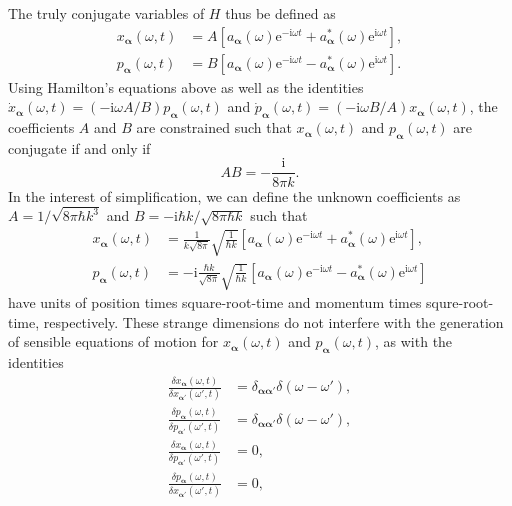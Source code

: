 \documentclass{article}
\numberwithin{equation}{section}
\begin{document}
The truly conjugate variables of $H$ thus be defined as
\begin{equation}
\begin{split}
x_{\bm{\alpha}}(\omega,t) &= A\left[a_{\bm{\alpha}}(\omega)\mathrm{e}^{-\mathrm{i}\omega t} + a_{\bm{\alpha}}^*(\omega)\mathrm{e}^{\mathrm{i}\omega t}\right],\\
p_{\bm{\alpha}}(\omega,t) &= B\left[a_{\bm{\alpha}}(\omega)\mathrm{e}^{-\mathrm{i}\omega t} - a_{\bm{\alpha}}^*(\omega)\mathrm{e}^{\mathrm{i}\omega t}\right].
\end{split}
\end{equation}
Using Hamilton's equations above as well as the identities $\dot{x}_{\bm{\alpha}}(\omega,t) = (-\mathrm{i}\omega A/B)p_{\bm{\alpha}}(\omega,t)$ and $\dot{p}_{\bm{\alpha}}(\omega,t) = (-\mathrm{i}\omega B/A)x_{\bm{\alpha}}(\omega,t)$, the coefficients $A$ and $B$ are constrained such that $x_{\bm{\alpha}}(\omega,t)$ and $p_{\bm{\alpha}}(\omega,t)$ are conjugate if and only if
\begin{equation}
AB = -\frac{\mathrm{i}}{8\pi k}.
\end{equation}
In the interest of simplification, we can define the unknown coefficients as $A = 1/\sqrt{8\pi\hbar k^3}$ and $B = -\mathrm{i}\hbar k/\sqrt{8\pi\hbar k}$ such that
\begin{equation}\label{eq:xAndP1}
\begin{split}
x_{\bm{\alpha}}(\omega,t) &= \frac{1}{k\sqrt{8\pi}}\sqrt{\frac{1}{\hbar k}}\left[a_{\bm{\alpha}}(\omega)\mathrm{e}^{-\mathrm{i}\omega t} + a_{\bm{\alpha}}^*(\omega)\mathrm{e}^{\mathrm{i}\omega t}\right],\\
p_{\bm{\alpha}}(\omega,t) &= -\mathrm{i}\frac{\hbar k}{\sqrt{8\pi}}\sqrt{\frac{1}{\hbar k}}\left[a_{\bm{\alpha}}(\omega)\mathrm{e}^{-\mathrm{i}\omega t} - a_{\bm{\alpha}}^*(\omega)\mathrm{e}^{\mathrm{i}\omega t}\right]
\end{split}
\end{equation}
have units of position times square-root-time and momentum times squre-root-time, respectively. These strange dimensions do not interfere with the generation of sensible equations of motion for $x_{\bm{\alpha}}(\omega,t)$ and $p_{\bm{\alpha}}(\omega,t)$, as with the identities
\begin{equation}\label{eq:varDeriv1}
\begin{split}
\frac{\delta x_{\bm{\alpha}}(\omega,t)}{\delta x_{\bm{\alpha}'}(\omega',t)} &= \delta_{\bm{\alpha}\bm{\alpha}'}\delta(\omega - \omega'),\\
\frac{\delta p_{\bm{\alpha}}(\omega,t)}{\delta p_{\bm{\alpha}'}(\omega',t)} &= \delta_{\bm{\alpha}\bm{\alpha}'}\delta(\omega - \omega'),\\
\frac{\delta x_{\bm{\alpha}}(\omega,t)}{\delta p_{\bm{\alpha}'}(\omega',t)} &= 0,\\
\frac{\delta p_{\bm{\alpha}}(\omega,t)}{\delta x_{\bm{\alpha}'}(\omega',t)} &= 0,\\
\end{split}
\end{equation}
\end{document}
